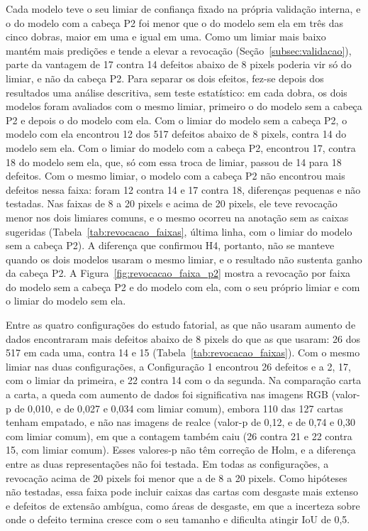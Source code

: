 \documentclass[
    12pt,                %
    openright,           %
    oneside,             %
    a4paper,             %
    english,             %
    brazil               %
]{abntex2}
\begin{document}
Cada modelo teve o seu limiar de confiança fixado na própria validação
interna, e o
do modelo com a cabeça P2 foi menor que o do modelo sem ela em três das
cinco dobras, maior em uma e igual em uma. Como um limiar mais baixo
mantém mais predições e tende a elevar a revocação
(Seção~\ref{subsec:validacao}), parte da vantagem de 17
contra 14 defeitos abaixo de 8 pixels poderia vir só do limiar,
e não da cabeça P2. Para separar os dois efeitos, fez-se depois dos
resultados uma análise descritiva, sem teste estatístico: em cada
dobra, os dois modelos foram avaliados com o mesmo limiar, primeiro o
do modelo sem a cabeça P2 e depois o do modelo com ela. Com o limiar do
modelo sem a cabeça P2, o modelo com ela encontrou 12 dos 517 defeitos
abaixo de 8 pixels, contra 14 do modelo sem ela. Com o limiar do modelo
com a cabeça P2, encontrou 17, contra 18 do modelo sem ela, que, só com
essa troca de limiar, passou de 14 para 18 defeitos. Com o mesmo
limiar, o modelo com a cabeça P2 não encontrou mais defeitos nessa
faixa: foram 12 contra 14 e 17 contra 18, diferenças pequenas e não
testadas. Nas faixas de 8 a 20 pixels e acima de 20
pixels, ele teve revocação menor nos dois
limiares comuns, e o mesmo ocorreu na anotação sem as caixas sugeridas
(Tabela~\ref{tab:revocacao_faixas}, última linha, com o limiar do
modelo sem a cabeça P2).
A diferença que confirmou H4, portanto, não se
manteve quando os dois modelos usaram o mesmo limiar, e o resultado
não sustenta ganho da cabeça P2. A
Figura~\ref{fig:revocacao_faixa_p2} mostra a revocação por faixa do modelo
sem a cabeça P2 e do modelo com ela, com o seu próprio limiar e com o
limiar do modelo sem ela.

Entre as quatro configurações do estudo fatorial, as que não usaram aumento de dados
encontraram mais defeitos abaixo de 8 pixels do que as que
usaram: 26 dos 517 em cada uma, contra 14 e 15
(Tabela~\ref{tab:revocacao_faixas}). Com o mesmo limiar nas duas
configurações, a Configuração 1 encontrou 26 defeitos e a 2, 17, com o
limiar da primeira, e 22 contra 14 com o da segunda. Na comparação carta a carta, a queda
com aumento de dados foi significativa nas imagens RGB (valor-p de
0,010, e de 0,027 e 0,034 com limiar comum), embora 110 das 127 cartas
tenham empatado, e não nas imagens de realce (valor-p de 0,12, e de
0,74 e 0,30 com limiar comum), em que a contagem também caiu (26 contra
21 e 22 contra 15, com limiar comum). Esses valores-p não têm correção de
Holm, e a diferença entre as duas representações não foi testada. Em todas as
configurações, a revocação acima de 20 pixels foi menor que a de 8 a 20
pixels. Como hipóteses não testadas, essa faixa pode incluir caixas das
cartas com desgaste mais extenso e defeitos de extensão ambígua, como
áreas de desgaste, em que a incerteza sobre onde o defeito termina
cresce com o seu tamanho e dificulta atingir IoU de 0,5.
\end{document}
